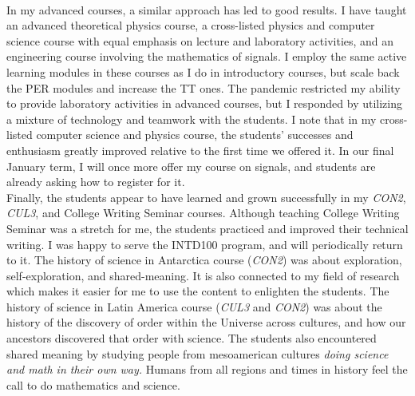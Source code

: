 \documentclass[../../../main.tex]{subfiles}
\begin{document}
\\
\vspace{0.25cm}
In my advanced courses, a similar approach has led to good results.  I have taught an advanced theoretical physics course, a cross-listed physics and computer science course with equal emphasis on lecture and laboratory activities, and an engineering course involving the mathematics of signals.  I employ the same active learning modules in these courses as I do in introductory courses, but scale back the PER modules and increase the TT ones.  The pandemic restricted my ability to provide laboratory activities in advanced courses, but I responded by utilizing a mixture of technology and teamwork with the students.  I note that in my cross-listed computer science and physics course, the students' successes and enthusiasm greatly improved relative to the first time we offered it.  In our final January term, I will once more offer my course on signals, and students are already asking how to register for it.
\\
\vspace{0.25cm}
Finally, the students appear to have learned and grown successfully in my \textit{CON2}, \textit{CUL3}, and College Writing Seminar courses.  Although teaching College Writing Seminar was a stretch for me, the students practiced and improved their technical writing.  I was happy to serve the INTD100 program, and will periodically return to it.  The history of science in Antarctica course (\textit{CON2}) was about exploration, self-exploration, and shared-meaning.  It is also connected to my field of research which makes it easier for me to use the content to enlighten the students.  The history of science in Latin America course (\textit{CUL3} and \textit{CON2}) was about the history of the discovery of order within the Universe across cultures, and how our ancestors discovered that order with science.  The students also encountered shared meaning by studying people from mesoamerican cultures \textit{doing science and math in their own way.}  Humans from all regions and times in history feel the call to do mathematics and science.
\end{document}
